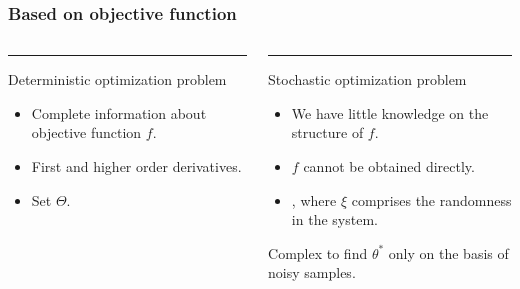 \begin{frame}
\frametitle{\centering Based on  objective function}
\begin{small}
\begin{columns}[T]
\begin{column}{.48\textwidth}
\color{red}\rule{\linewidth}{4pt}
Deterministic optimization problem
\begin{itemize}
\item Complete information about objective function $f$.
\item First and higher order derivatives.
\item Set $\Theta$.
\end{itemize}
\end{column}
\pause
\begin{column}{.48\textwidth}
\color{blue}\rule{\linewidth}{4pt}
Stochastic optimization problem
\begin{itemize}
\item We have little knowledge on the structure of $f$.
\item $f$ cannot be obtained directly.
\item {}, 
where $\xi$ comprises the randomness in the system.
\end{itemize}

Complex  to find $\theta^{*}$ only on the basis of noisy samples.
\end{column}
\end{columns}
\end{small}
\end{frame}



